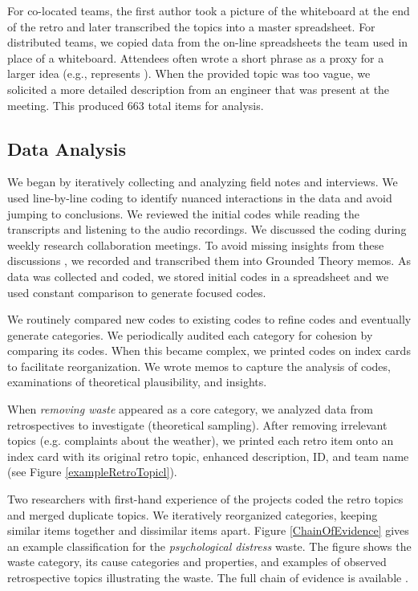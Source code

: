 For co-located teams, the first author took a picture of the whiteboard at the end of the retro and later transcribed the topics into a master spreadsheet. For distributed teams, we copied data from the on-line spreadsheets the team used in place of a whiteboard. Attendees often wrote a short phrase as a proxy for a larger idea (e.g.,   represents ). When the provided topic was too vague, we solicited a more detailed description from an engineer that was present at the meeting. This produced 663 total items for analysis. 
\subsection{Data Analysis}
We began by iteratively collecting and analyzing field notes and interviews. We used line-by-line coding \cite{Charmaz} to identify nuanced interactions in the data and avoid jumping to conclusions. We reviewed the initial codes while reading the transcripts and listening to the audio recordings. We discussed the coding during weekly research collaboration meetings. To avoid missing insights from these discussions \cite{GlaserTheoreticalSensitivity}, we recorded and transcribed them into Grounded Theory memos. As data was collected and coded, we stored initial codes in a spreadsheet and we used constant comparison to generate focused codes.

We routinely compared new codes to existing codes to refine codes and eventually generate categories. We periodically audited each category for cohesion by comparing its codes. When this became complex, we printed codes on index cards to facilitate reorganization. We wrote memos to capture the analysis of codes, examinations of theoretical plausibility, and insights.

When \textit{removing waste} appeared as a core category, we analyzed data from retrospectives to investigate (theoretical sampling). After removing irrelevant topics (e.g. complaints about the weather), we printed each retro item onto an index card with its original retro topic, enhanced description, ID, and team name (see Figure \ref{exampleRetroTopicl}).

Two researchers with first-hand experience of the projects coded the retro topics and merged duplicate topics. We iteratively reorganized categories, keeping similar items together and dissimilar items apart. Figure \ref{ChainOfEvidence} gives an example classification for the \textit{psychological distress} waste. The figure shows the waste category, its cause categories and properties, and examples of observed retrospective topics illustrating the waste. The full chain of evidence is available \cite{SedanoDissertation}. 

